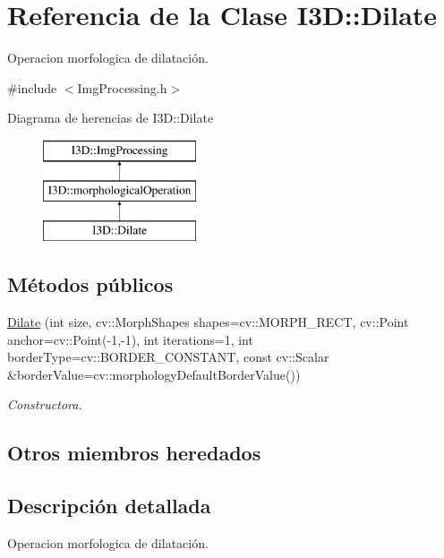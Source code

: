 \hypertarget{class_i3_d_1_1_dilate}{}\section{Referencia de la Clase I3D\+:\+:Dilate}
\label{class_i3_d_1_1_dilate}


Operacion morfologica de dilatación.  




{\ttfamily \#include $<$Img\+Processing.\+h$>$}

Diagrama de herencias de I3D\+:\+:Dilate\begin{figure}[H]
\begin{center}
\leavevmode
\includegraphics[height=3.000000cm]{class_i3_d_1_1_dilate}
\end{center}
\end{figure}
\subsection*{Métodos públicos}
\begin{DoxyCompactItemize}
\item 
\hyperlink{class_i3_d_1_1_dilate_a6b44ace9b52b4eab5da68d574e4ad7f1}{Dilate} (int size, cv\+::\+Morph\+Shapes shapes=cv\+::\+M\+O\+R\+P\+H\+\_\+\+R\+E\+CT, cv\+::\+Point anchor=cv\+::\+Point(-\/1,-\/1), int iterations=1, int border\+Type=cv\+::\+B\+O\+R\+D\+E\+R\+\_\+\+C\+O\+N\+S\+T\+A\+NT, const cv\+::\+Scalar \&border\+Value=cv\+::morphology\+Default\+Border\+Value())
\begin{DoxyCompactList}\small\item\em Constructora. \end{DoxyCompactList}\end{DoxyCompactItemize}
\subsection*{Otros miembros heredados}


\subsection{Descripción detallada}
Operacion morfologica de dilatación. 

